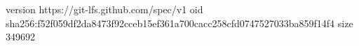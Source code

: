 version https://git-lfs.github.com/spec/v1
oid sha256:f52f059df2da8473f92cceb15ef361a700cacc258cfd0747527033ba859f14f4
size 349692
